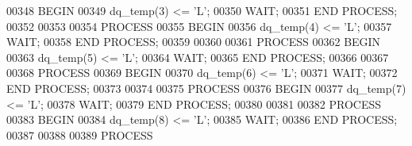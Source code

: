 \begin{DoxyCode}
00348   \textcolor{keywordflow}{BEGIN}
00349     \textcolor{vhdlchar}{dq_temp}\textcolor{vhdlchar}{(}\textcolor{vhdllogic}{}\textcolor{vhdllogic}{3}\textcolor{vhdlchar}{)} \textcolor{vhdlchar}{<=} \textcolor{vhdlchar}{'}\textcolor{vhdlchar}{L}\textcolor{vhdlchar}{'};  
00350   \textcolor{keywordflow}{WAIT};
00351   \textcolor{keywordflow}{END} \textcolor{keywordflow}{PROCESS};
00352   
00353   
00354   \textcolor{keywordflow}{PROCESS}
00355   \textcolor{keywordflow}{BEGIN}
00356     \textcolor{vhdlchar}{dq_temp}\textcolor{vhdlchar}{(}\textcolor{vhdllogic}{}\textcolor{vhdllogic}{4}\textcolor{vhdlchar}{)} \textcolor{vhdlchar}{<=} \textcolor{vhdlchar}{'}\textcolor{vhdlchar}{L}\textcolor{vhdlchar}{'};  
00357   \textcolor{keywordflow}{WAIT};
00358   \textcolor{keywordflow}{END} \textcolor{keywordflow}{PROCESS};
00359   
00360   
00361   \textcolor{keywordflow}{PROCESS}
00362   \textcolor{keywordflow}{BEGIN}
00363     \textcolor{vhdlchar}{dq_temp}\textcolor{vhdlchar}{(}\textcolor{vhdllogic}{}\textcolor{vhdllogic}{5}\textcolor{vhdlchar}{)} \textcolor{vhdlchar}{<=} \textcolor{vhdlchar}{'}\textcolor{vhdlchar}{L}\textcolor{vhdlchar}{'};  
00364   \textcolor{keywordflow}{WAIT};
00365   \textcolor{keywordflow}{END} \textcolor{keywordflow}{PROCESS};
00366   
00367   
00368   \textcolor{keywordflow}{PROCESS}
00369   \textcolor{keywordflow}{BEGIN}
00370     \textcolor{vhdlchar}{dq_temp}\textcolor{vhdlchar}{(}\textcolor{vhdllogic}{}\textcolor{vhdllogic}{6}\textcolor{vhdlchar}{)} \textcolor{vhdlchar}{<=} \textcolor{vhdlchar}{'}\textcolor{vhdlchar}{L}\textcolor{vhdlchar}{'};  
00371   \textcolor{keywordflow}{WAIT};
00372   \textcolor{keywordflow}{END} \textcolor{keywordflow}{PROCESS};
00373   
00374   
00375   \textcolor{keywordflow}{PROCESS}
00376   \textcolor{keywordflow}{BEGIN}
00377     \textcolor{vhdlchar}{dq_temp}\textcolor{vhdlchar}{(}\textcolor{vhdllogic}{}\textcolor{vhdllogic}{7}\textcolor{vhdlchar}{)} \textcolor{vhdlchar}{<=} \textcolor{vhdlchar}{'}\textcolor{vhdlchar}{L}\textcolor{vhdlchar}{'};  
00378   \textcolor{keywordflow}{WAIT};
00379   \textcolor{keywordflow}{END} \textcolor{keywordflow}{PROCESS};
00380   
00381   
00382   \textcolor{keywordflow}{PROCESS}
00383   \textcolor{keywordflow}{BEGIN}
00384     \textcolor{vhdlchar}{dq_temp}\textcolor{vhdlchar}{(}\textcolor{vhdllogic}{}\textcolor{vhdllogic}{8}\textcolor{vhdlchar}{)} \textcolor{vhdlchar}{<=} \textcolor{vhdlchar}{'}\textcolor{vhdlchar}{L}\textcolor{vhdlchar}{'};  
00385   \textcolor{keywordflow}{WAIT};
00386   \textcolor{keywordflow}{END} \textcolor{keywordflow}{PROCESS};
00387   
00388   
00389   \textcolor{keywordflow}{PROCESS}

\end{DoxyCode}
